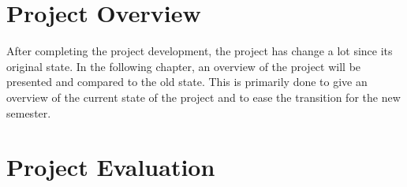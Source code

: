 \chapter{Project Overview}\label{CAP:ProjectOverview}
After completing the project development, the project has change a lot since its original state.
In the following chapter, an overview of the project will be presented and compared to the old state.
This is primarily done to give an overview of the current state of the project and to ease the transition for the new semester.



\chapter{Project Evaluation}\label{CAP:ProjectEvaluation}


